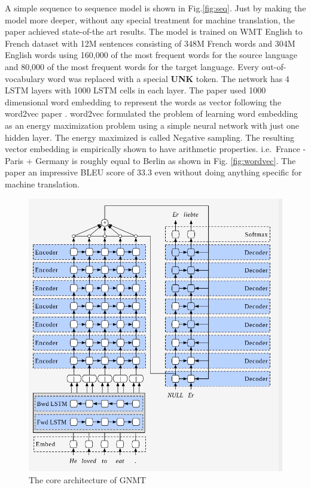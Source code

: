 \documentclass[a4paper]{article}
\begin{document}
A simple  sequence  to sequence  model is shown in Fig.\ref{fig:seq}.  Just by
making  the  model more  deeper,  without  any  special  treatment  for  machine
translation, the paper achieved  state-of-the art results. The model is  trained
on WMT  English  to French dataset  with 12M sentences consisting of 348M French
words and 304M  English words using 160,000 of  the  most frequent words for the
source  language  and 80,000 of the most frequent words for the target language.
Every out-of-vocabulary word was replaced with a special \textbf{UNK} token. The
network has  4  LSTM layers with 1000 LSTM cells in each  layer. The  paper used
1000  dimensional word  embedding to represent the words as vector following the
word2vec paper \cite{mikolov2013distributed}. word2vec formulated the problem of
learning word embedding as an  energy maximization problem using a simple neural
network  with just one hidden layer. The  energy maximized  is  called  Negative
sampling. The resulting vector embedding is empirically shown to have arithmetic
properties.  i.e. $\,$France  -  Paris  + Germany  is roughly equal to Berlin as
shown in Fig. \ref{fig:wordvec}. The paper an impressive BLEU score of 33.3 even
without doing anything specific for machine translation.


\begin{figure}
  \centering
  \includegraphics[width=.9\linewidth]{img/gnmt_1.png}
  \caption{The core architecture of GNMT }
  \label{fig:gnmt1}
\end{figure}
\end{document}
